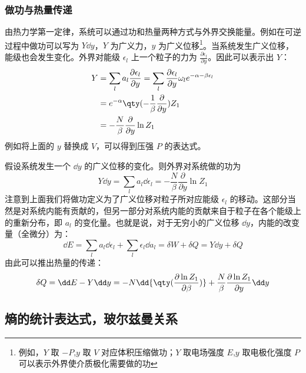 \subsubsection{做功与热量传递}
由热力学第一定律，系统可以通过功和热量两种方式与外界交换能量。例如在可逆过程中做功可以写为 $Y\dd y$，$Y$ 为广义力，$y$ 为广义位移\footnote{例如，$Y$ 取 $-P$,$y$ 取 $V$ 对应体积压缩做功；$Y$ 取电场强度 $E$,$y$ 取电极化强度 $P$ 可以表示外界使介质极化需要做的功}。当系统发生广义位移，能级也会发生变化。外界对能级 $\epsilon_l$ 上一个粒子的力为 $\frac{\partial \epsilon_l}{\partial y}$。因此可以表示出 $Y$：
\begin{equation}
\begin{aligned}
Y&=\sum_l a_l\frac{\partial \epsilon_l}{\partial y}=\sum_l \frac{\partial \epsilon_l}{\partial y}\omega_le^{-\alpha-\beta\epsilon_l}\\
&=e^{-\alpha}\qty(-\frac{1}{\beta}\frac{\partial }{\partial y})Z_1\\
&=-\frac{N}{\beta}\frac{\partial }{\partial y}\ln Z_1
\end{aligned}
\end{equation}
例如将上面的 $y$ 替换成 $V$，可以得到压强 $P$ 的表达式。

假设系统发生一个 $\dd y$ 的广义位移的变化。则外界对系统做的功为
\begin{equation}
Y\dd y=\sum_l a_l\dd \epsilon_l=-\frac{N}{\beta}\frac{\partial }{\partial y}\ln Z_1
\end{equation}
注意到上面我们将做功定义为了广义位移对粒子所对应能级 $\epsilon_l$ 的移动。这部分当然是对系统内能有贡献的，但另一部分对系统内能的贡献来自于粒子在各个能级上的重新分布，即 $a_l$ 的变化量。也就是说，对于无穷小的广义位移 $\dd y$，内能的改变量（全微分）为：
\begin{equation}
\dd E=\sum_l a_l\dd \epsilon_l+\sum_l\epsilon_l\dd a_l=\delta W+\delta Q=Y\dd y+\delta Q
\end{equation}
由此可以推出热量的传递：
\begin{equation}\label{eq_TheSta_2}
\delta Q=\dd E-Y\dd y=
-N\dd{\qty(\frac{\partial \ln Z_1}{\partial \beta})}+\frac{N}{\beta}\frac{\partial \ln Z_1}{\partial y}\dd y
\end{equation}
\subsection{熵的统计表达式，玻尔兹曼关系}
